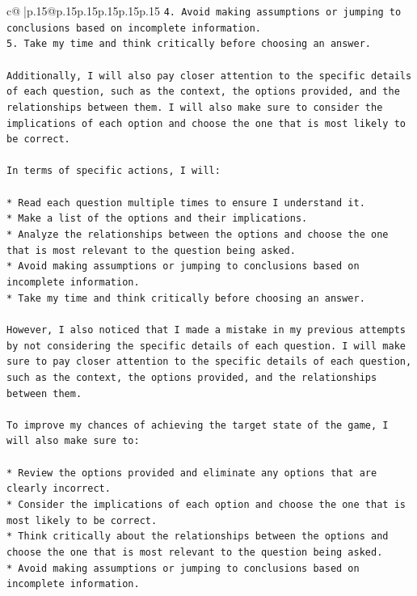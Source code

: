 \documentclass{article}
\begin{document}
{\begin{supertabular}{c@{$\;$}|p{.15\linewidth}@{}p{.15\linewidth}p{.15\linewidth}p{.15\linewidth}p{.15\linewidth}p{.15\linewidth}}
{{{\texttt{4. Avoid making assumptions or jumping to conclusions based on incomplete information.} \\
\texttt{5. Take my time and think critically before choosing an answer.} \\
\\ 
\texttt{Additionally, I will also pay closer attention to the specific details of each question, such as the context, the options provided, and the relationships between them. I will also make sure to consider the implications of each option and choose the one that is most likely to be correct.} \\
\\ 
\texttt{In terms of specific actions, I will:} \\
\\ 
\texttt{* Read each question multiple times to ensure I understand it.} \\
\texttt{* Make a list of the options and their implications.} \\
\texttt{* Analyze the relationships between the options and choose the one that is most relevant to the question being asked.} \\
\texttt{* Avoid making assumptions or jumping to conclusions based on incomplete information.} \\
\texttt{* Take my time and think critically before choosing an answer.} \\
\\ 
\texttt{However, I also noticed that I made a mistake in my previous attempts by not considering the specific details of each question. I will make sure to pay closer attention to the specific details of each question, such as the context, the options provided, and the relationships between them.} \\
\\ 
\texttt{To improve my chances of achieving the target state of the game, I will also make sure to:} \\
\\ 
\texttt{* Review the options provided and eliminate any options that are clearly incorrect.} \\
\texttt{* Consider the implications of each option and choose the one that is most likely to be correct.} \\
\texttt{* Think critically about the relationships between the options and choose the one that is most relevant to the question being asked.} \\
\texttt{* Avoid making assumptions or jumping to conclusions based on incomplete information.} \\
}}}
\end{supertabular}}
\end{document}
